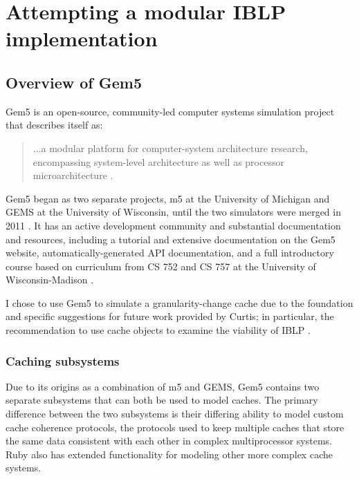 \documentclass[12pt,twoside]{reedthesis}
\begin{document}
	\vfill

\chapter{Attempting a modular IBLP implementation}

\section{Overview of Gem5}

Gem5 is an open-source, community-led computer systems simulation project that describes itself as: \begin{quote}
	...a modular platform for computer-system architecture research, encompassing system-level architecture as well as processor microarchitecture \cite{gem5-about}.
\end{quote}

Gem5 began as two separate projects, m5 at the University of Michigan and GEMS at the University of Wisconsin, until the two simulators were merged in 2011 \cite{gem5-about}. It has an active development community and substantial documentation and resources, including a tutorial and extensive documentation on the Gem5 website, automatically-generated API documentation, and a full introductory course based on curriculum from CS 752 and CS 757 at the University of Wisconsin-Madison \cite{gem5-docs}.

I chose to use Gem5 to simulate a granularity-change cache due to the foundation and specific suggestions for future work provided by Curtis; in particular, the recommendation to use cache objects to examine the viability of IBLP \cite{curtis}.

	\subsection*{Caching subsystems}

	Due to its origins as a combination of m5 and GEMS, Gem5 contains two separate subsystems that can both be used to model caches. The primary difference between the two subsystems is their differing ability to model custom cache coherence protocols, the protocols used to keep multiple caches that store the same data consistent with each other in complex multiprocessor systems. Ruby also has extended functionality for modeling other more complex cache systems.
	
\end{document}
